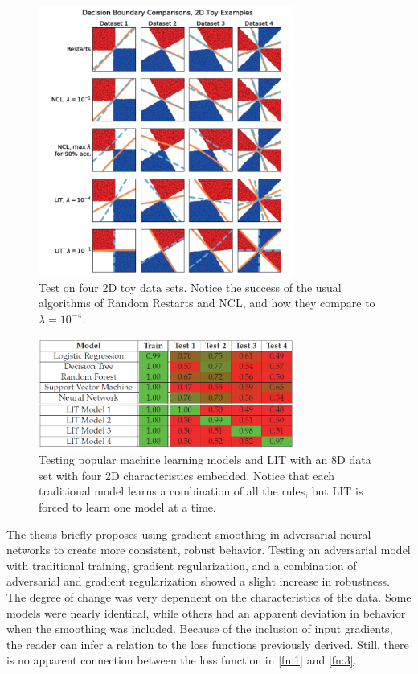 \documentclass[twoside,11pt]{article}
\begin{document}
\begin{figure}[!ht]
\centering
	\includegraphics[width=0.75\textwidth]{dis_fig1.png}
	\caption{Test on four 2D toy data sets. Notice the success of the usual algorithms of Random Restarts and NCL,  and how they compare to $\lambda = 10^{-4}$.}
	\label{fig:1}
\end{figure}
\begin{figure}[!ht]
\centering
	\includegraphics[width=0.75\textwidth]{dis_fig2.png}
	\caption{Testing popular machine learning models and LIT with an 8D data set with four 2D characteristics embedded. Notice that each traditional model learns a combination of all the rules, but LIT is forced to learn one model at a time.}
	\label{fig:2}
\end{figure} 

The thesis briefly proposes using gradient smoothing in adversarial neural networks to create more consistent, robust behavior. Testing an adversarial model with traditional training, gradient regularization, and a combination of adversarial and gradient regularization showed a slight increase in robustness. The degree of change was very dependent on the characteristics of the data. Some models were nearly identical, while others had an apparent deviation in behavior when the smoothing was included. Because of the inclusion of input gradients, the reader can infer a relation to the loss functions previously derived. Still, there is no apparent connection between the loss function in \cref{fn:1} and \cref{fn:3}.
\end{document}
